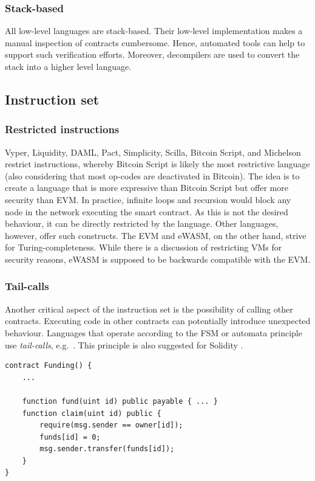 \subsubsection{Stack-based}
All low-level languages are stack-based. Their low-level implementation makes a manual inspection of contracts cumbersome. Hence, automated tools can help to support such verification efforts. Moreover, decompilers are used to convert the stack into a higher level language.

\subsection{Instruction set}
\subsubsection{Restricted instructions}
Vyper, Liquidity, DAML, Pact, Simplicity, Scilla, Bitcoin Script, and Michelson restrict instructions, whereby Bitcoin Script is likely the most restrictive language (also considering that most op-codes are deactivated in Bitcoin). 
The idea is to create a language that is more expressive than Bitcoin Script but offer more security than EVM.
In practice, infinite loops and recursion would block any node in the network executing the smart contract. As this is not the desired behaviour, it can be directly restricted by the language. Other languages, however, offer such constructs.
The EVM and eWASM, on the other hand, strive for Turing-completeness. While there is a discussion of restricting VMs for security reasons, eWASM is supposed to be backwards compatible with the EVM.

\subsubsection{Tail-calls}
Another critical aspect of the instruction set is the possibility of calling other contracts. Executing code in other contracts can potentially introduce unexpected behaviour. Languages that operate according to the FSM or automata principle use \emph{tail-calls}, e.g.\ \cite{Sergey2018}. This principle is also suggested for Solidity \cite{ConsenSys2018Security}.

\begin{lstlisting}[caption={Tail calls implemented in Solidity.},label=lst:tail-call,language=Solidity]
contract Funding() { 
	...
	
	function fund(uint id) public payable { ... }
	function claim(uint id) public {
		require(msg.sender == owner[id]);
		funds[id] = 0;
		msg.sender.transfer(funds[id]);
	}
}
\end{lstlisting}

